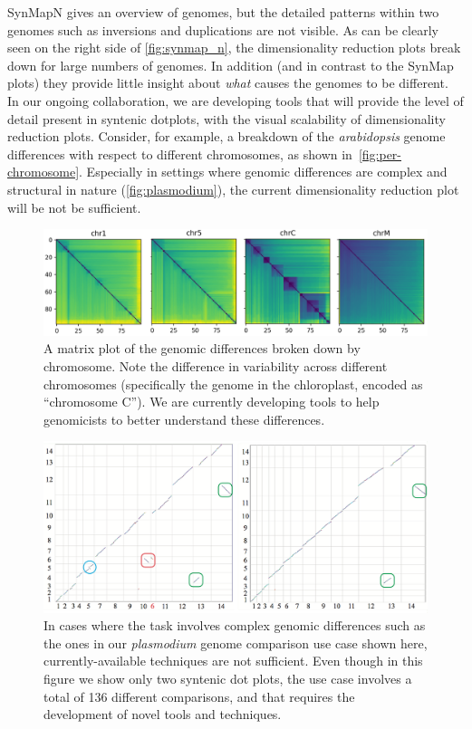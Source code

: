 \documentclass{vgtc}                      %
\begin{document}
SynMapN gives an overview of genomes, but the detailed patterns within two genomes such as inversions and duplications are not visible.
As can be clearly seen on the right side of \autoref{fig:synmap_n}, the dimensionality reduction plots break down for large numbers of genomes. In addition (and in contrast to the SynMap plots) they provide little insight about \emph{what} causes the genomes to be different. In our ongoing collaboration, we are developing tools that will provide the level of detail present in syntenic dotplots, with the visual scalability of dimensionality reduction plots. Consider, for example, a breakdown of the \emph{arabidopsis} genome differences with respect to different chromosomes, as shown in~\autoref{fig:per-chromosome}. Especially in settings where genomic differences are complex and structural in nature (\autoref{fig:plasmodium}), the current dimensionality reduction plot will be not be sufficient.

\begin{figure}[t]
 \centering
 \includegraphics[width=\columnwidth]{chromosomes_matrix}
 \caption{A matrix plot of the genomic differences broken down by chromosome. Note the difference in variability across different chromosomes (specifically the genome in the chloroplast, encoded as ``chromosome C''). We are currently developing tools to help genomicists to better understand these differences.}
 \label{fig:per-chromosome}
\end{figure}

\begin{figure}[t]
 \centering
 \includegraphics[width=0.6\columnwidth]{plasmodium}
 \caption{In cases where the task involves complex genomic differences such as the ones in our \emph{plasmodium} genome comparison use case shown here, currently-available techniques are not sufficient. Even though in this figure we show only two syntenic dot plots, the use case involves a total of 136 different comparisons, and that requires the development of novel tools and techniques.}
 \label{fig:plasmodium}
\end{figure}
\end{document}
